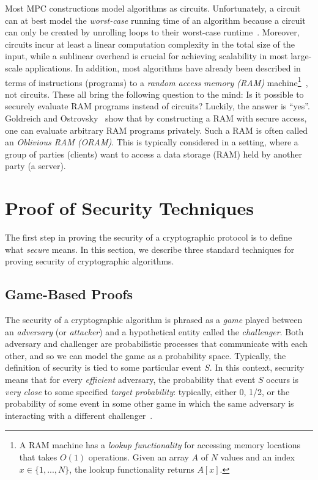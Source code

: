 \documentclass[10pt]{article}
\theoremstyle{plain}
\begin{document}
\label{sec:oram} Most MPC constructions model algorithms as circuits.
Unfortunately, a circuit can at best model the \emph{worst-case} running
time of an algorithm because a circuit can only be created by unrolling
loops to their worst-case runtime~\cite{Goldwasser:2013:Turing}.
Moreover, circuits incur at least a linear computation complexity
in the total size of the input, while a sublinear overhead is crucial
for achieving scalability in most large-scale applications. In addition,
most algorithms have already been described in terms of instructions
(programs) to a \emph{random access memory (RAM)} machine\footnote{A RAM machine has a \emph{lookup functionality} for accessing memory
	locations that takes $O(1)$ operations. Given an array $A$ of $N$
	values and an index $x\in\{1,...,N\}$, the lookup functionality returns
	$A[x]$.}~\cite{Cook:1972:TRA:800152.804898}, not circuits. These all bring
the following question to the mind: Is it possible to securely evaluate
RAM programs instead of circuits? Luckily, the answer is ``yes''.
Goldreich and Ostrovsky~\cite{Goldreich:1996:SPS:233551.233553}
show that by constructing a RAM with secure access, one can evaluate
arbitrary RAM programs privately. Such a RAM is often called an \emph{Oblivious
	RAM (ORAM)}. This is typically considered in a setting, where a group
of parties (clients) want to access a data storage (RAM) held by another
party (a server). 

\section{Proof of Security Techniques}

The first step in proving the security of a cryptographic protocol
is to define what \emph{secure} means. In this section, we describe
three standard techniques for proving security of cryptographic algorithms.

\subsection{Game-Based Proofs}

The security of a cryptographic algorithm is phrased as a \emph{game}
played between an \emph{adversary} (or \emph{attacker}) and a hypothetical
entity called the \emph{challenger}. Both adversary and challenger
are probabilistic processes that communicate with each other, and
so we can model the game as a probability space. Typically, the definition
of security is tied to some particular event $S$. In this context,
security means that for every \emph{efficient} adversary, the probability
that event $S$ occurs is \emph{very close} to some specified \emph{target
	probability}: typically, either 0, 1/2, or the probability of some
event in some other game in which the same adversary is interacting
with a different challenger~\cite{cryptoeprint:2004:332}.
\end{document}
